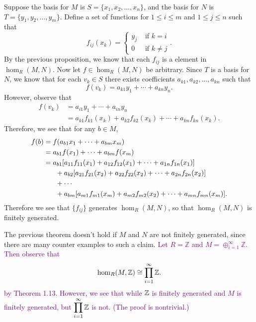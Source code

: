 \begin{prf}
    Suppose the basis for $M$ is $S = \{x_1, x_2, \dots, x_n\}$,
    and the basis for $N$ is $T = \{y_1, y_2, \dots, y_m\}$.
    Define a set of functions for $1 \le i \le m$ and $1 \le j \le
    n$ such that 
    \[
        f_{ij}(x_k) = 
        \begin{cases}
            y_j & \text{ if } k = i\\
            0 & \text{ if } k \ne j
        \end{cases}.
    \]
    By the previous proposition, we know that each $f_{ij}$ is a
    element in $\hom_R(M, N)$. Now let $f \in
    \hom_R(M,N)$ be arbitrary. Since $T$ is a basis for $N$, we
    know that for each $v_k \in S$ there exists coefficients
    $a_{k1}, a_{k2}, \dots, a_{kn}$ such that  
    \[
        f(v_k) = a_{k1}y_1 + \cdots + a_{kn}y_n.
    \]
    However, observe that 
    \begin{align*}
        f(v_k) &= a_{i1}y_1 + \cdots + a_{in}y_n\\
        &= a_{k1}f_{k1}(x_k) + a_{k2}f_{k2}(x_k) + \cdots + a_{kn}f_{kn}(x_k).
    \end{align*}
    Therefore, we see that for any $b \in M$, 
    \begin{align*}
        f(b) &= f(a_{b1}x_1 + \cdots + a_{bm}x_m)\\
        &=  a_{b1}f(x_1) + \cdots + a_{bm}f(x_m)\\
        &= a_{b1}[a_{11}f_{11}(x_1) + a_{12}f_{12}(x_1) + \cdots + a_{1n}f_{1n}(x_1)]\\
        &\hspace{.6cm} + a_{b2}[a_{21}f_{21}(x_2) + a_{22}f_{22}(x_2) + \cdots + a_{2n}f_{2n}(x_2)]\\
        &\hspace{.6cm} + \cdots\\
        &\hspace{.6cm} + a_{bm}[a_{m1}f_{m1}(x_m) + a_{m2}f_{m2}(x_2) + \cdots + a_{mn}f_{mn}(x_m)].
    \end{align*}
    Therefore we see that $\{f_{ij}\}$ generates $\hom_R(M, N)$,
    so that $\hom_R(M, N)$ is finitely generated.
\end{prf}
The previous theorem doesn't hold if $M$ and $N$ are not finitely
generated, since there are many counter examples to such a
claim. 
\textcolor{purple}{
Let $R = \mathbb{Z}$ and $M = \oplus_{i =
1}^{\infty}\mathbb{Z}$. Then observe that 
\[
    \hom_R(M, \mathbb{Z}) \cong \prod_{i = 1}^{\infty}\mathbb{Z}.
\]
by Theorem 1.13. However, we see that while $\mathbb{Z}$ is finitely 
generated and $M$ is finitely generated, but $\displaystyle \prod_{i =
1}^{\infty}\mathbb{Z}$ is not. (The proof is nontrivial.)}

